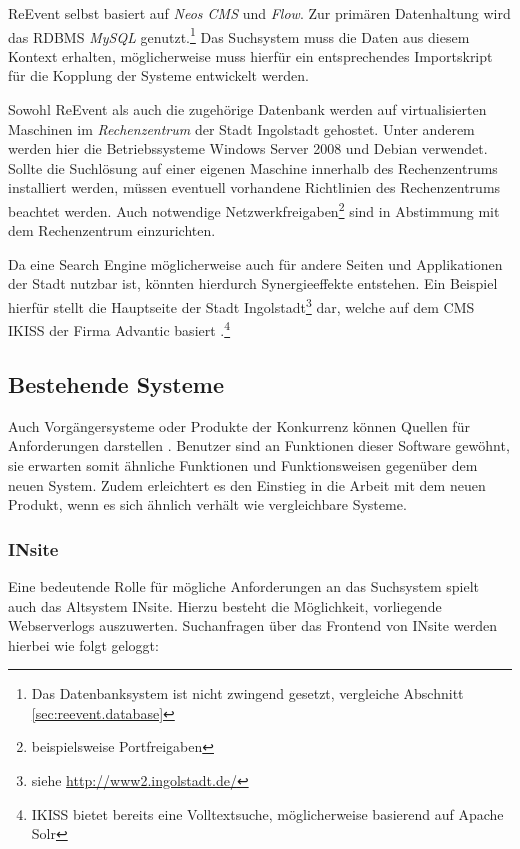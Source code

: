 ReEvent selbst basiert auf \emph{Neos CMS} und \emph{Flow}. Zur primären Datenhaltung wird das RDBMS \emph{MySQL} genutzt.\footnote{Das Datenbanksystem ist nicht zwingend gesetzt, vergleiche Abschnitt \ref{sec:reevent.database}} Das Suchsystem muss die Daten aus diesem Kontext erhalten, möglicherweise muss hierfür ein entsprechendes Importskript für die Kopplung der Systeme entwickelt werden.

Sowohl ReEvent als auch die zugehörige Datenbank werden auf virtualisierten Maschinen im \emph{Rechenzentrum} der Stadt Ingolstadt gehostet. Unter anderem werden hier die Betriebssysteme Windows Server 2008 und Debian verwendet. Sollte die Suchlösung auf einer eigenen Maschine innerhalb des Rechenzentrums installiert werden, müssen eventuell vorhandene Richtlinien des Rechenzentrums beachtet werden. Auch notwendige Netzwerkfreigaben\footnote{beispielsweise Portfreigaben} sind in Abstimmung mit dem Rechenzentrum einzurichten.

Da eine Search Engine möglicherweise auch für andere Seiten und Applikationen der Stadt nutzbar ist, könnten hierdurch Synergieeffekte entstehen. Ein Beispiel hierfür stellt die Hauptseite der Stadt Ingolstadt\footnote{siehe \url{http://www2.ingolstadt.de/}} dar, welche auf dem CMS IKISS der Firma Advantic basiert \cite{AdvanticSystemhausGmbH.2015}.\footnote{IKISS bietet bereits eine Volltextsuche, möglicherweise basierend auf Apache Solr}

\subsection{Bestehende Systeme}
\label{sec:requirements_existing}

Auch Vorgängersysteme oder Produkte der Konkurrenz können Quellen für Anforderungen darstellen \cite[S. 21]{Pohl.2015}. Benutzer sind an Funktionen dieser Software gewöhnt, sie erwarten somit ähnliche Funktionen und Funktionsweisen gegenüber dem neuen System. Zudem erleichtert es den Einstieg in die Arbeit mit dem neuen Produkt, wenn es sich ähnlich verhält wie vergleichbare Systeme.

\subsubsection{INsite}
\label{sec:requirements_insite}

Eine bedeutende Rolle für mögliche Anforderungen an das Suchsystem spielt auch das Altsystem INsite. Hierzu besteht die Möglichkeit, vorliegende Webserverlogs auszuwerten. Suchanfragen über das Frontend von INsite werden hierbei wie folgt geloggt:

